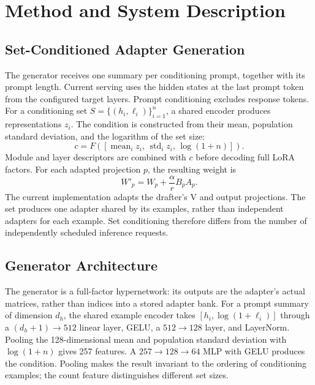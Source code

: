 \section{Method and System Description}
\label{sec:method}

\subsection{Set-Conditioned Adapter Generation}
The generator receives one summary per conditioning prompt, together with its
prompt length. Current serving uses the hidden states at the last prompt token
from the configured target layers. Prompt conditioning excludes response tokens.
For a conditioning set $S=\{(h_i,\ell_i)\}_{i=1}^{n}$, a shared encoder produces
representations $z_i$. The condition is constructed from their mean, population
standard deviation, and the logarithm of the set size:
\begin{equation}
 c=F\!\left([\operatorname{mean}_i z_i,\,
 \operatorname{std}_i z_i,\,\log(1+n)]\right).
\end{equation}
Module and layer descriptors are combined with $c$ before decoding full LoRA
factors. For each adapted projection $p$, the resulting weight is
\begin{equation}
 W'_p=W_p+\frac{\alpha}{r}B_pA_p.
\end{equation}
The current implementation adapts the drafter's V and output projections.
The set produces one adapter shared by its examples, rather than independent
adapters for each example. Set conditioning therefore differs from the number
of independently scheduled inference requests.

\subsection{Generator Architecture}
The generator is a full-factor hypernetwork: its outputs are the adapter's
actual matrices, rather than indices into a stored adapter bank. For a prompt
summary of dimension $d_h$, the shared example encoder takes
$[h_i,\log(1+\ell_i)]$ through a $(d_h+1)\!\rightarrow\!512$ linear layer,
GELU, a $512\!\rightarrow\!128$ layer, and LayerNorm. Pooling the 128-dimensional
mean and population standard deviation with $\log(1+n)$ gives 257 features.
A $257\!\rightarrow\!128\!\rightarrow\!64$ MLP with GELU produces the condition.
Pooling makes the result invariant to the ordering of conditioning examples;
the count feature distinguishes different set sizes.

